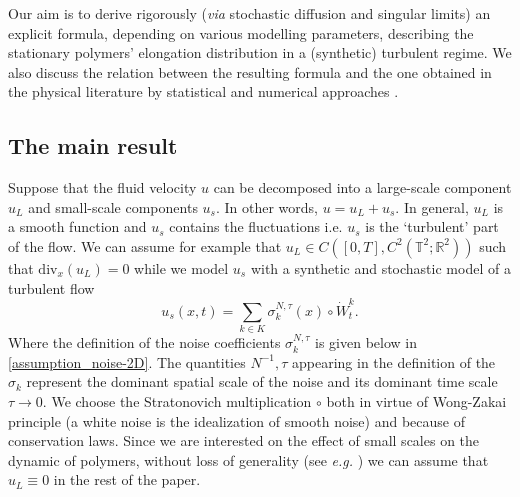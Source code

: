 \documentclass[a4paper,12pt, reqno]{amsart}
\newcommand{\T}{\mathbb{T}}
\newcommand{\R}{\mathbb{R}}
\newcommand{\Div}{\text{div}}
\begin{document}

    Our aim is to derive rigorously (\textit{via} stochastic diffusion and singular limits) an explicit formula, depending on various modelling parameters, describing the stationary polymers' elongation distribution in a (synthetic) turbulent regime. We also discuss  the relation between the  resulting formula and  the one obtained in the physical literature by statistical and numerical approaches \cite{Afonso2005nonlinear,Balk}.
    
\subsection{The main result}\label{scales-modeling-sect}
Suppose that the fluid velocity $u$ can be decomposed into a large-scale component $u_L$ and small-scale components $u_s$. In other words,  $u=u_L+u_s$.  In general, $u_L$ is a smooth function and $u_s$ contains the fluctuations i.e. $u_s$ is the `turbulent' part of the flow. We can assume for example that  $u_L\in C([0,T],C^2(\T^2;\R^2))$    such    that    $\Div_x(u_L)=0$ while we model $u_s$ with a synthetic and stochastic model of a turbulent flow 
\begin{equation}\label{small-scale-model-main}
    u_s(x,t)=\sum_{k\in K}\sigma_{k}^{N,\tau}\left(  x\right)\circ  \dot W_{t}^{k}.
    \end{equation}
    Where the definition of the noise coefficients $\sigma_k^{N, \tau}$ is given below in \autoref{assumption_noise-2D}. The quantities $N^{-1}, \tau$ appearing in the definition of the $\sigma_k$ represent the dominant spatial scale of the noise and its dominant time scale $\tau \rightarrow 0$.
We choose the Stratonovich multiplication $\circ$ both in virtue of Wong-Zakai principle (a white noise is the idealization of smooth noise) and because of conservation laws.
Since we are interested on the effect of small scales on the dynamic of polymers, without loss of generality (see \textit{e.g.} \cite{Flandoli-Tahraoui}) we can assume that $u_L\equiv 0$ in the rest of the paper. \\
\end{document}
